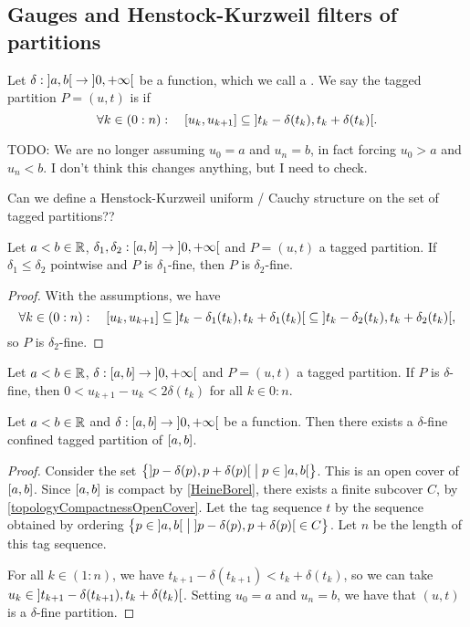 \subsection{Gauges and Henstock-Kurzweil filters of partitions}
\begin{definition}
Let $\delta: \interval[o]{a,b}\to \interval[o]{0,+\infty}$ be a function, which we call a . We say the tagged partition $P = (u,t)$ is  if
\[ \forall k\in (0:n): \quad \interval{u_k, u_{k+1}} \subseteq \interval[o]{t_k-\delta(t_k), t_k+\delta(t_k)}. \]
\end{definition}
TODO: We are no longer assuming $u_0 = a$ and $u_{n} = b$, in fact forcing $u_0 > a$ and $u_n < b$. I don't think this changes anything, but I need to check.

Can we define a Henstock-Kurzweil uniform / Cauchy structure on the set of tagged partitions??

\begin{lemma} \label{smallerGaugeFunctionFinerPartition}
Let $a <  b\in \mathbb{R}$, $\delta_1, \delta_2: \interval{a,b}\to \interval[o]{0,+\infty}$ and $P = (u,t)$ a tagged partition. If $\delta_1 \leq \delta_2$ pointwise and $P$ is $\delta_1$-fine, then $P$ is $\delta_2$-fine.
\end{lemma}
\begin{proof}
With the assumptions, we have
\[ \forall k\in (0:n): \quad \interval{u_k, u_{k+1}} \subseteq \interval[o]{t_k-\delta_1(t_k), t_k+\delta_1(t_k)} \subseteq \interval[o]{t_k-\delta_2(t_k), t_k+\delta_2(t_k)}, \]
so $P$ is $\delta_2$-fine.
\end{proof}

\begin{lemma} \label{deltaFinePartitionWidthBound}
Let $a <  b\in \mathbb{R}$, $\delta: \interval{a,b}\to \interval[o]{0,+\infty}$ and $P = (u,t)$ a tagged partition. If $P$ is $\delta$-fine, then $0< u_{k+1}-u_k < 2\delta(t_k)$ for all $k\in 0:n$.
\end{lemma}

\begin{lemma} \label{cousinsLemma}
Let $a <  b\in \mathbb{R}$ and $\delta: \interval{a,b}\to \interval[o]{0,+\infty}$ be a function. Then there exists a $\delta$-fine confined tagged partition of $\interval{a,b}$.
\end{lemma}
\begin{proof}
Consider the set $\setbuilder[\big]{\interval[o]{p-\delta(p), p+\delta(p)}}{p\in \interval[o]{a,b}}$. This is an open cover of $\interval{a,b}$. Since $\interval{a,b}$ is compact by \ref{HeineBorel}, there exists a finite subcover $C$, by \ref{topologyCompactnessOpenCover}. Let the tag sequence $t$ by the sequence obtained by ordering $\setbuilder[\big]{p\in\interval[o]{a,b}}{\interval[o]{p-\delta(p), p+\delta(p)}\in C}$. Let $n$ be the length of this tag sequence.


For all $k\in (1:n)$, we have $t_{k+1}-\delta(t_{k+1}) < t_k + \delta(t_k)$, so we can take $u_{k} \in \interval[o]{t_{k+1}-\delta(t_{k+1}), t_k + \delta(t_k)}$. Setting $u_0 = a$ and $u_{n} = b$, we have that $(u,t)$ is a $\delta$-fine partition.
\end{proof}

